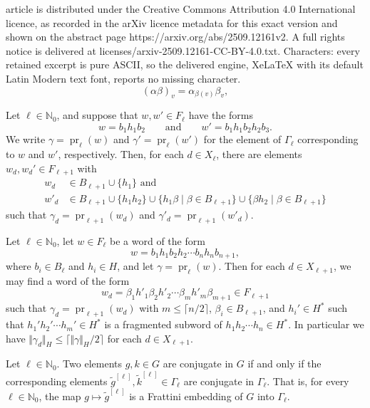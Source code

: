 \documentclass[10pt,a4paper]{amsart}
\DeclareMathOperator{\pr}{pr}
\newcommand{\N}{\mathbb{N}}
\newcommand{\absH}[1]{\Vert #1 \Vert_H}
\newcommand{\bigAbsH}[1]{\bigl\Vert #1 \bigr\Vert_H}
\renewcommand\leq\leqslant
\begin{document}
article is distributed under the Creative Commons Attribution 4.0 International licence, as recorded in the arXiv licence metadata for this exact version and shown on the abstract page https://arxiv.org/abs/2509.12161v2. A full rights notice is delivered at licenses/arxiv-2509.12161-CC-BY-4.0.txt. Characters: every retained excerpt is pure ASCII, so the delivered engine, XeLaTeX with its default Latin Modern text font, reports no missing character.
\begin{equation}\label{eq:section-formula}
(\alpha \beta)_v = \alpha_{\beta(v)} \beta_v,
\end{equation}

\begin{lemma}\label{lem:length-contraction-base-case}
  Let $\ell \in \N_0$, and suppose that $w, w' \in F_\ell$ have the forms
  \[
    w = b_1 h_1 b_2
    \qquad\text{and}\qquad
    w' = b_1 h_1 b_2 h_2 b_3.
  \]
  We write $\gamma = \pr_\ell(w)$ and $\gamma'=\pr_\ell(w')$ for the element of $\Gamma_\ell$ corresponding to $w$ and $w'$, respectively.
  Then, for each $d\in X_\ell$, there are elements $w_d,w_d' \in F_{\ell+1}$ with
  \begin{align*}
    w_d &\in
        B_{\ell+1}
        \cup \{ h_1 \}\text{ and}\\
    w'_d &\in
        B_{\ell+1}
        \cup \{ h_1 h_2 \}
        \cup \{ h_1 \beta \mid \beta \in B_{\ell+1} \}
        \cup \{ \beta h_2 \mid \beta \in B_{\ell+1} \}
  \end{align*}
  such that $\gamma_d = \pr_{\ell + 1}(w_d)$ and $\gamma'_d = \pr_{\ell+1}(w'_d)$.
\end{lemma}

\begin{lemma}\label{lem:length-contraction}
Let $\ell \in \N_0$, let $w \in F_{\ell}$ be a word of the form
\[
w = b_1 h_1 b_2 h_2 \cdots b_n h_n b_{n+1},
\]
where $b_i \in B_\ell$ and $h_i\in H$, and let $\gamma = \pr_\ell(w)$.
Then for each $d \in X_{\ell+1}$, we may find a word of the form
\[
w_d = \beta_1 h'_1 \beta_2 h'_2 \cdots \beta_m h'_m \beta_{m+1} \in F_{\ell+1}
\]
such that $\gamma_d = \pr_{\ell+1}(w_d)$ with $m \leq \lceil n/2 \rceil$, $\beta_i \in B_{\ell+1}$, and $h_i'\in H^*$ such that $h_1' h_2' \cdots h_m'\in H^*$ is a fragmented subword of $h_1 h_2 \cdots h_n \in H^*$.
In particular we have $\bigAbsH{\gamma_d} \leq \lceil \absH{\gamma}/2 \rceil$  for each $d\in X_{\ell+1}$.
\end{lemma}

\begin{theorem}\label{thm:fratini-embedding}
Let $\ell \in \N_0$.
Two elements $g,k \in G$ are conjugate in $G$ if and only if the corresponding elements $\widetilde{g}^{[\ell]},\widetilde{k}^{[\ell]}\in \Gamma_\ell$ are conjugate in $\Gamma_\ell$.
  That is, for every $\ell\in \N_0$, the map $g\mapsto \widetilde{g}^{[\ell]}$ is a Frattini embedding of $G$ into $\Gamma_\ell$.
\end{theorem}
\end{document}
